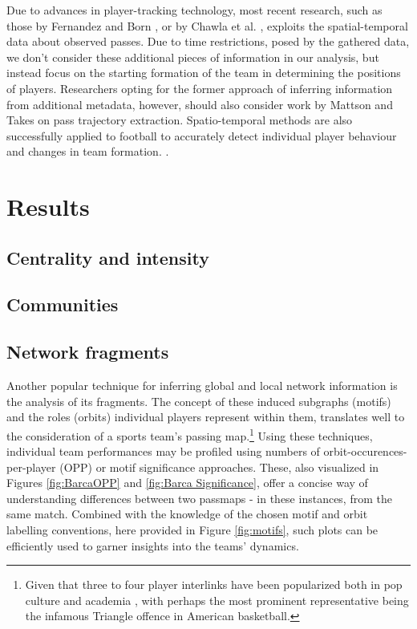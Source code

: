 \documentclass[9pt,twocolumn,twoside]{pnas-report}
\begin{document}
Due to advances in player-tracking technology, most recent research, such as those by Fernandez and Born \cite{fbrn}, or by Chawla et al. \cite{chawla}, exploits the spatial-temporal data about observed passes. Due to time restrictions, posed by the gathered data, we don't consider these additional pieces of information in our analysis, but instead focus on the starting formation of the team in determining the positions of players. Researchers opting for the former approach of inferring information from additional metadata, however, should also consider work by Mattson and Takes \cite{trajectory} on pass trajectory extraction. Spatio-temporal methods are also successfully applied to football to accurately detect individual player behaviour and changes in team formation. \cite{bialkowski2014large}.

\section*{Results}

\subsection*{Centrality and intensity}
\subsection*{Communities}
\subsection*{Network fragments}
Another popular technique for inferring global and local network information is the analysis of its fragments. The concept of these induced subgraphs (motifs) and the roles (orbits) individual players represent within them, translates well to the consideration of a sports team's passing map.\footnote{Given that three to four player interlinks have been popularized both in pop culture and academia \cite{triangle}, with perhaps the most prominent representative being the infamous Triangle offence in American basketball.}  Using these techniques, individual team performances may be profiled using numbers of orbit-occurences-per-player (OPP) or motif significance approaches. These, also visualized in Figures \ref{fig:BarcaOPP} and \ref{fig:Barca Significance}, offer a concise way of understanding differences between two passmaps - in these instances, from the same match. Combined with the knowledge of the chosen motif and orbit labelling conventions, here provided in Figure \ref{fig:motifs}, such plots can be efficiently used to garner insights into the teams' dynamics. 
\end{document}
